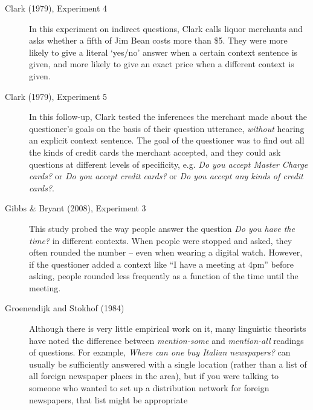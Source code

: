 \documentclass[12pt]{article}   	%
\begin{document}
\noindent\begin{description}
\item[Clark (1979), Experiment 4] In this experiment on indirect questions, Clark calls liquor merchants and asks whether a fifth of Jim Bean costs more than \$5. They were more likely to give a literal `yes/no' answer when a certain context sentence is given, and more likely to give an exact price when a different context is given.

\item[Clark (1979), Experiment 5] In this follow-up, Clark tested the inferences the merchant made about the questioner's goals on the basis of their question utterance, \emph{without} hearing an explicit context sentence. The goal of the questioner was to find out all the kinds of credit cards the merchant accepted, and they could ask questions at different levels of specificity, e.g. \emph{Do you accept Master Charge cards?} or \emph{Do you accept credit cards?} or \emph{Do you accept any kinds of credit cards?}.

\item[Gibbs \& Bryant (2008), Experiment 3] This study probed the way people answer the question \emph{Do you have the time?} in different contexts. When people were stopped and asked, they often rounded the number -- even when wearing a digital watch. However, if the questioner added a context like ``I have a meeting at 4pm'' before asking, people rounded less frequently as a function of the time until the meeting.

\item[Groenendijk and Stokhof (1984)] Although there is very little empirical work on it, many linguistic theorists have noted the difference between \emph{mention-some} and \emph{mention-all} readings of questions. For example, \emph{Where can one buy Italian newspapers?} can usually be sufficiently answered with a single location (rather than a list of all foreign newspaper places in the area), but if you were talking to someone who wanted to set up a distribution network for foreign newspapers, that list might be appropriate
\end{description}



\end{document}
